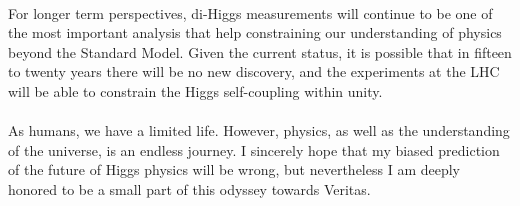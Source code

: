 \paragraph{}
For longer term perspectives, di-Higgs measurements will continue to be one of the most important analysis that help constraining our understanding of physics beyond the Standard Model. Given the current status, it is possible that in fifteen to twenty years there will be no new discovery, and the experiments at the LHC will be able to constrain the Higgs self-coupling within unity. 

\paragraph{}
As humans, we have a limited life. However, physics, as well as the understanding of the universe, is an endless journey. I sincerely hope that my biased prediction of the future of Higgs physics will be wrong, but nevertheless I am deeply honored to be a small part of this odyssey towards Veritas.
